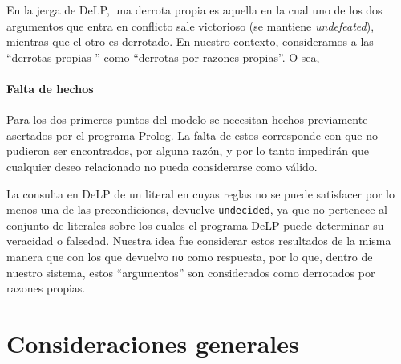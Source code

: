 \documentclass[oneside]{book}
\begin{document}
En la jerga de DeLP, una derrota propia es aquella en la cual uno de los dos 
argumentos que entra en conflicto sale victorioso (se mantiene \emph{undefeated}),
mientras que el otro es derrotado. En nuestro contexto, consideramos a las 
``derrotas propias '' como ``derrotas por razones propias''. O sea, 

\subsubsection{Falta de hechos}

Para los dos primeros puntos del modelo se necesitan hechos previamente asertados 
por el programa Prolog. La falta de estos corresponde con que no pudieron ser 
encontrados, por alguna razón, y por lo tanto impedirán que cualquier deseo 
relacionado no pueda considerarse como válido.

La consulta en DeLP de un literal en cuyas reglas no se puede satisfacer por lo
menos una de las precondiciones, devuelve 
\texttt{undecided}, ya que no pertenece al conjunto de literales sobre los cuales
el programa DeLP puede determinar su veracidad o falsedad. Nuestra idea fue 
considerar estos resultados de la misma manera que con los que devuelvo \texttt{no}
como respuesta, por lo que, dentro de nuestro sistema, estos ``argumentos'' son
considerados como derrotados por razones propias.






\chapter{Consideraciones generales}
\end{document}
